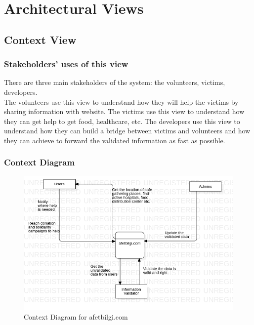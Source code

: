 \chapter{Architectural Views}

\section{Context View}

\subsection{Stakeholders' uses of this view}

There are three main stakeholders of the system: the volunteers, victims, developers. \\

The volunteers use this view to understand how they will help the victims by sharing information with website.
The victims use this view to understand how they can get help to get food, healthcare, etc.
The developers use this view to understand how they can build a bridge between victims and volunteers and how they can achieve to forward the validated information as fast as possible.

\subsection{Context Diagram}

\begin{figure}[H]
    \includegraphics[scale = 0.6]{assets/Context Diagram.png}
    \caption[Context Diagram for afetbilgi.com]{Context Diagram for afetbilgi.com}
\end{figure}

